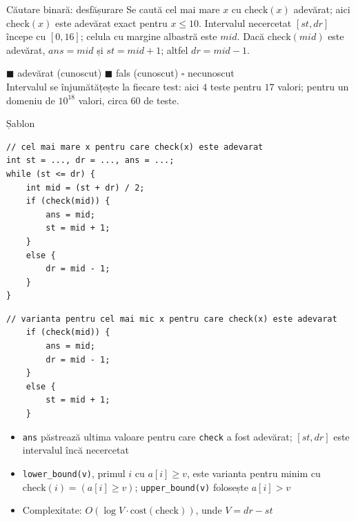 \documentclass[8pt,mathserif]{beamer}
\newcommand{\bsrow}[5]{%
  \foreach \i in {0,...,16} {%
    \ifnum\i<#2\relax \tikzset{cs/.style={cellT}}%
    \else\ifnum\i>#3\relax \tikzset{cs/.style={cellF}}%
    \else \tikzset{cs/.style={cellU}}\fi\fi
    \ifnum\i=#4\relax \tikzset{cs/.style={cellU,line width=1.6pt,draw=igBlue}}\fi
    \node[cs,minimum width=0.4cm,minimum height=0.5cm] at (\i*0.41,-#1*0.75) {\tiny\i};}%
  \node[lab,font=\scriptsize] at (16*0.41+0.3,-#1*0.75) {#5};}
\begin{document}
\begin{frame}{Căutare binară: desfășurare}
  Se caută cel mai mare $x$ cu $\mathrm{check}(x)$ adevărat; aici $\mathrm{check}(x)$ este adevărat exact pentru $x \le 10$. Intervalul necercetat $[st, dr]$ începe cu $[0, 16]$; celula cu margine albastră este $mid$. Dacă $\mathrm{check}(mid)$ este adevărat, $ans = mid$ și $st = mid + 1$; altfel $dr = mid - 1$.
  \smallskip

  \centering

  \raggedright
  \textcolor{igGreen}{$\blacksquare$} adevărat (cunoscut) \quad \textcolor{igRed}{$\blacksquare$} fals (cunoscut) \quad $\square$ necunoscut\\
  Intervalul se înjumătățește la fiecare test: aici $4$ teste pentru $17$ valori; pentru un domeniu de $10^{18}$ valori, circa $60$ de teste.
\end{frame}

\begin{frame}[fragile]{Șablon}
  \begin{lstlisting}
// cel mai mare x pentru care check(x) este adevarat
int st = ..., dr = ..., ans = ...;
while (st <= dr) {
    int mid = (st + dr) / 2;
    if (check(mid)) {
        ans = mid;
        st = mid + 1;
    }
    else {
        dr = mid - 1;
    }
}
  \end{lstlisting}
  \begin{lstlisting}
// varianta pentru cel mai mic x pentru care check(x) este adevarat
    if (check(mid)) {
        ans = mid;
        dr = mid - 1;
    }
    else {
        st = mid + 1;
    }
  \end{lstlisting}
  \begin{itemize}
    \item \texttt{ans} păstrează ultima valoare pentru care \texttt{check} a fost adevărat; $[st, dr]$ este intervalul încă necercetat
    \item \texttt{lower\_bound(v)}, primul $i$ cu $a[i] \ge v$, este varianta pentru minim cu $\mathrm{check}(i) = (a[i] \ge v)$; \texttt{upper\_bound(v)} folosește $a[i] > v$
    \item Complexitate: $O(\log V \cdot \mathrm{cost}(\mathrm{check}))$, unde $V = dr - st$
  \end{itemize}
\end{frame}
\end{document}
